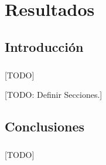 \documentclass{subfiles}
\begin{document}
  \chapter{Resultados}
  \label{chap:results}

    \section{Introducción}
    \label{sec:results_introduction}

      \paragraph{}
      [TODO]

    [TODO: Definir Secciones.]

    \section{Conclusiones}
    \label{sec:results_conclusions}

      \paragraph{}
      [TODO]
\end{document}
